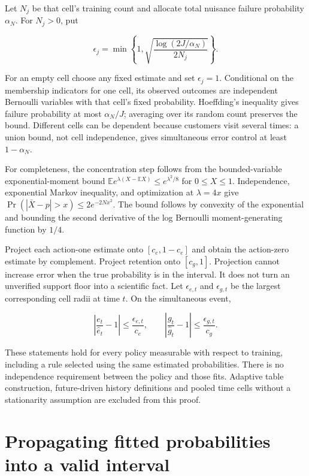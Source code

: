 Let \(N_j\) be that cell's training count and allocate total nuisance
failure probability \(\alpha_N\). For \(N_j>0\), put

\[
 \epsilon_j=\min\left\{1,\sqrt{\frac{\log(2J/\alpha_N)}{2N_j}}\right\}.
\]

For an empty cell choose any fixed estimate and set \(\epsilon_j=1\).
Conditional on the membership indicators for one cell, its observed
outcomes are independent Bernoulli variables with that cell's fixed
probability. Hoeffding's inequality gives failure probability at most
\(\alpha_N/J\); averaging over its random count preserves the bound.
Different cells can be dependent because customers visit several times:
a union bound, not cell independence, gives simultaneous error control
at least \(1-\alpha_N\).

For completeness, the concentration step follows from the
bounded-variable exponential-moment bound
\(\mathbb E e^{\lambda(X-\mathbb EX)}\le e^{\lambda^2/8}\) for
\(0\le X\le1\). Independence, exponential Markov inequality, and
optimization at \(\lambda=4x\) give \(\Pr(|\bar X-p|>x)\le2e^{-2Nx^2}\).
The bound follows by convexity of the exponential and bounding the
second derivative of the log Bernoulli moment-generating function by
\(1/4\).

Project each action-one estimate onto \([c_e,1-c_e]\) and obtain the
action-zero estimate by complement. Project retention onto \([c_g,1]\).
Projection cannot increase error when the true probability is in the
interval. It does not turn an unverified support floor into a scientific
fact. Let \(\epsilon_{e,t}\) and \(\epsilon_{g,t}\) be the largest
corresponding cell radii at time \(t\). On the simultaneous event,

\[
 \left|\frac{e_t}{\widehat e_t}-1\right|
 \le\frac{\epsilon_{e,t}}{c_e},\qquad
 \left|\frac{g_t}{\widehat g_t}-1\right|
 \le\frac{\epsilon_{g,t}}{c_g}.
\]

These statements hold for every policy measurable with respect to
training, including a rule selected using the same estimated
probabilities. There is no independence requirement between the policy
and those fits. Adaptive table construction, future-driven history
definitions and pooled time cells without a stationarity assumption are
excluded from this proof.

\hypertarget{propagating-fitted-probabilities-into-a-valid-interval}{%
\section{Propagating fitted probabilities into a valid
interval}\label{propagating-fitted-probabilities-into-a-valid-interval}}

